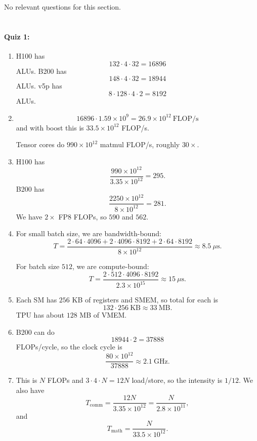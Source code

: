 \documentclass[11pt]{article}
\newcommand{\flops}{\mathrm{FLOP/s}}
\newcommand{\us}{\mu\mathrm{s}}
\newcommand{\quizbreak}{\Needspace{6\baselineskip}}
\begin{document}
\clearpage
\section{}

No relevant questions for this section.

\clearpage
\section{}

\quizbreak
\paragraph{Quiz 1:}
\begin{enumerate}
  \item H100 has
  \[
    132\cdot 4\cdot 32 = 16896
  \]
  ALUs. B200 has
  \[
    148\cdot 4\cdot 32 = 18944
  \]
  ALUs. v5p has
  \[
    8\cdot 128\cdot 4\cdot 2 = 8192
  \]
  ALUs.

  \item
  \[
    16896\cdot 1.59\times 10^9
    =
    26.9\times 10^{12}\ \flops
  \]
  and with boost this is $33.5\times 10^{12}$ FLOP/s.

  Tensor cores do $990\times 10^{12}$ matmul FLOP/s, roughly $30\times$.

  \item H100 has
  \[
    \frac{990\times 10^{12}}{3.35\times 10^{12}}=295.
  \]
  B200 has
  \[
    \frac{2250\times 10^{12}}{8\times 10^{12}}=281.
  \]
  We have $2\times$ FP8 FLOPs, so $590$ and $562$.

  \item For small batch size, we are bandwidth-bound:
  \[
    T
    =
    \frac{
      2\cdot 64\cdot 4096
      +2\cdot 4096\cdot 8192
      +2\cdot 64\cdot 8192
    }{8\times 10^{12}}
    \approx 8.5\ \us.
  \]

  For batch size $512$, we are compute-bound:
  \[
    T
    =
    \frac{2\cdot 512\cdot 4096\cdot 8192}{2.3\times 10^{15}}
    \approx 15\ \us.
  \]

  \item Each SM has $256$ KB of registers and SMEM, so total for each is
  \[
    132\cdot 256\ \mathrm{KB}\approx 33\ \mathrm{MB}.
  \]
  TPU has about $128$ MB of VMEM.

  \item B200 can do
  \[
    18944\cdot 2 = 37888
  \]
  FLOPs/cycle, so the clock cycle is
  \[
    \frac{80\times 10^{12}}{37888}
    \approx 2.1\ \mathrm{GHz}.
  \]

  \item This is $N$ FLOPs and $3\cdot 4\cdot N=12N$ load/store, so the intensity is $1/12$. We also have
  \[
    T_{\mathrm{comm}}
    =
    \frac{12N}{3.35\times 10^{12}}
    =
    \frac{N}{2.8\times 10^{11}},
  \]
  and
  \[
    T_{\mathrm{math}}
    =
    \frac{N}{33.5\times 10^{12}}.
  \]
\end{enumerate}
\end{document}
